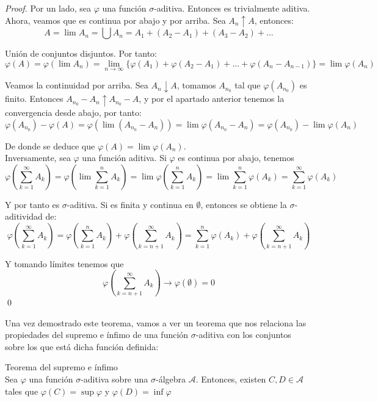 \begin{proof}
Por un lado, sea $\varphi$ una función $\sigma$-aditiva. Entonces es trivialmente aditiva. Ahora, veamos que es continua por abajo y por arriba. Sea $A_n \uparrow A$, entonces:
$$ A = \lim A_n = \bigcup A_n = A_1 + (A_2 - A_1) + (A_3 - A_2) +... $$

Unión de conjuntos disjuntos. Por tanto:
$$ \varphi (A) = \varphi (\lim A_n) = \lim_{n \to \infty } \{ \varphi (A_1) + \varphi (A_2 - A_1) + ... + \varphi (A_n - A_{n-1}) \} = \lim \varphi (A_n) $$

Veamos la continuidad por arriba. Sea $A_n \downarrow A$, tomamos $A_{n_0}$ tal que $\varphi (A_{n_0})$ es finito. Entonces $A_{n_0} - A_n \uparrow A_{n_0} - A$, y por el apartado anterior tenemos la convergencia desde abajo, por tanto:
$$ \varphi (A_{n_0}) - \varphi (A) = \varphi (\lim (A_{n_0} - A_n)) = \lim \varphi (A_{n_0} - A_n) = \varphi (A_{n_0}) - \lim \varphi (A_n) $$

De donde se deduce que $ \varphi (A) = \lim \varphi (A_n) $.\\

Inversamente, sea $ \varphi$ una función aditiva. Si $\varphi$ es continua por abajo, tenemos
$$ \varphi \left( \sum_{k=1}^{\infty} A_k \right) = \varphi \left( \lim \sum_{k=1}^n A_k \right) = \lim \varphi \left( \sum_{k=1}^n A_k \right) = \lim \sum_{k=1}^n \varphi \left( A_k \right) = \sum_{k=1}^{\infty} \varphi (A_k) $$

Y por tanto es $\sigma$-aditiva. Si es finita y continua en $\emptyset$, entonces se obtiene la $\sigma$-aditividad de:
$$ \varphi \left( \sum_{k=1}^{\infty} A_k \right) = \varphi \left( \sum_{k=1}^{n} A_k \right) + \varphi \left( \sum_{k=n+1}^{\infty} A_k \right) = \sum_{k=1}^{n} \varphi (A_k) + \varphi \left( \sum_{k=n+1}^{\infty} A_k \right) $$

Y tomando límites tenemos que
$$ \varphi \left( \sum_{k=n+1}^{\infty} A_k \right) \to \varphi (\emptyset) = 0 $$
\qed
\end{proof}

Una vez demostrado este teorema, vamos a ver un teorema que nos relaciona las propiedades del supremo e ínfimo de una función $\sigma$-aditiva con los conjuntos sobre los que está dicha función definida:

\begin{theorem}
Teorema del supremo e ínfimo\\

Sea $\varphi$ una función $\sigma$-aditiva sobre una $\sigma$-álgebra $\mathcal{A}$. Entonces, existen $C,D \in \mathcal{A}$ tales que $\varphi (C) = \sup \varphi$ y $\varphi (D) = \inf \varphi$
\end{theorem}

